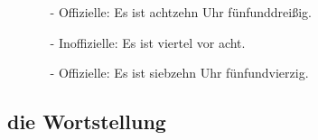 \begin{multicols}{2}
\begin{itemize}[before=\renewcommand{\baselinestretch}{1},topsep=0pt,itemsep=4pt,parsep=0pt]
\begin{itemize}
                            \item[-] Offizielle: {\color{saffron}Es ist achtzehn Uhr fünfunddreißig.}
                        \end{itemize}
                    \item[] {\color{deep_carmine}}
                        \begin{itemize}
                            \item[-] Inoffizielle: {\color{deep_carmine}Es ist  viertel vor acht.}
                            \item[-] Offizielle: {\color{deep_carmine}Es ist siebzehn Uhr fünfundvierzig.}
                        \end{itemize}
                \end{itemize}
            \vfill\null
            \end{multicols}
            \vfill\null

    \subsection{die Wortstellung}\label{subsection:deutsch:wortstellung}

    
